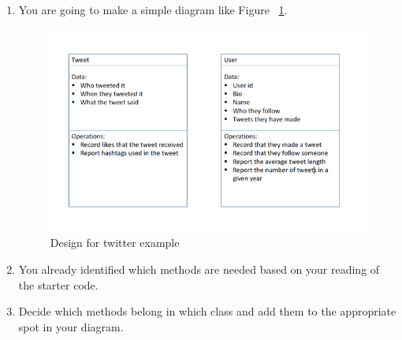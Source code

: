 \documentclass[12pt]{article}
\begin{document}
\begin{enumerate}[1.]
    \item You are going to make a simple diagram like Figure ~\ref{fig:uml}.

    \begin{figure}
        \begin{center}
        \includegraphics[width=0.8\linewidth]{../../images/lab_3/uml.png}
        \end{center}
        \caption{Design for twitter example}
        \label{fig:uml}
    \end{figure}

    \item You already identified which methods are needed based on your reading of the
    starter code.
    \item Decide which methods belong in which class and add them to the appropriate
    spot in your diagram.


\end{enumerate}
\end{document}
